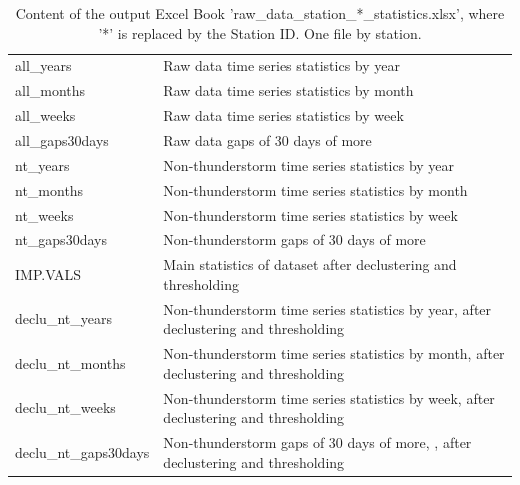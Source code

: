\documentclass[12pt,oneside]{reedthesis}
\begin{document}
\begingroup\fontsize{8}{10}\selectfont
\begin{longtable}[t]{>{\raggedright\arraybackslash}p{1.2in}>{\raggedright\arraybackslash}p{4.6in}}
\caption[rawdatastationidstatistics]{\label{tab:rawdatastationidstatistics}Content of the output Excel Book 'raw\_data\_station\_*\_statistics.xlsx', where '*' is replaced by the Station ID. One file by station.}\\
\toprule
\multicolumn{1}{l}{Excel Sheet Name} & \multicolumn{1}{l}{Description}\\
\midrule
all\_years & Raw data time series statistics by year\\
all\_months & Raw data time series statistics by month\\
all\_weeks & Raw data time series statistics by week\\
all\_gaps30days & Raw data gaps of 30 days of more\\
nt\_years & Non-thunderstorm time series statistics by year\\
nt\_months & Non-thunderstorm time series statistics by month\\
nt\_weeks & Non-thunderstorm time series statistics by week\\
nt\_gaps30days & Non-thunderstorm gaps of 30 days of more\\
IMP.VALS & Main statistics of dataset after declustering and thresholding\\
declu\_nt\_years & Non-thunderstorm time series statistics by year, after declustering and thresholding\\
declu\_nt\_months & Non-thunderstorm time series statistics by month, after declustering and thresholding\\
declu\_nt\_weeks & Non-thunderstorm time series statistics by week, after declustering and thresholding\\
declu\_nt\_gaps30days & Non-thunderstorm gaps of 30 days of more, , after declustering and thresholding\\
\bottomrule
\end{longtable}
\endgroup{}
\end{document}

